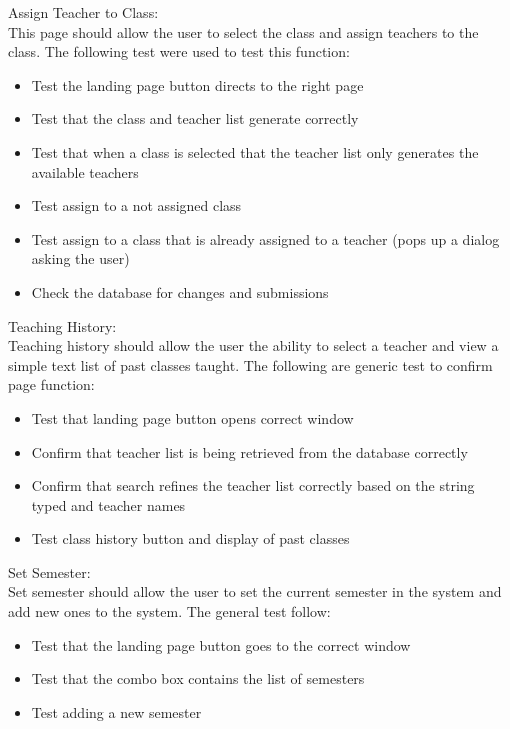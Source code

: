 Assign Teacher to Class:\\
This page should allow the user to select the class and assign teachers to the class. The following test were used to test this function:

\begin{itemize}
\item Test the landing page button directs to the right page
\item Test that the class and teacher list generate correctly
\item Test that when a class is selected that the teacher list only generates the available teachers 
\item Test assign to a not assigned class
\item Test assign to a class that is already assigned to a teacher (pops up a dialog asking the user)
\item Check the database for changes and submissions 
\end{itemize}

Teaching History:\\
Teaching history should allow the user the ability to select a teacher and view a simple text list of past classes taught. The following are generic test to confirm page function:

\begin{itemize}
\item Test that landing page button opens correct window
\item Confirm that teacher list is being retrieved from the database correctly
\item Confirm that search refines the teacher list correctly based on the string typed and teacher names
\item Test class history button and display of past classes
\end{itemize}

Set Semester:\\
Set semester should allow the user to set the current semester in the system and add new ones to the system. The general test follow:

\begin{itemize}
\item Test that the landing page button goes to the correct window
\item Test that the combo box contains the list of semesters
\item Test adding a new semester
\end{itemize}

